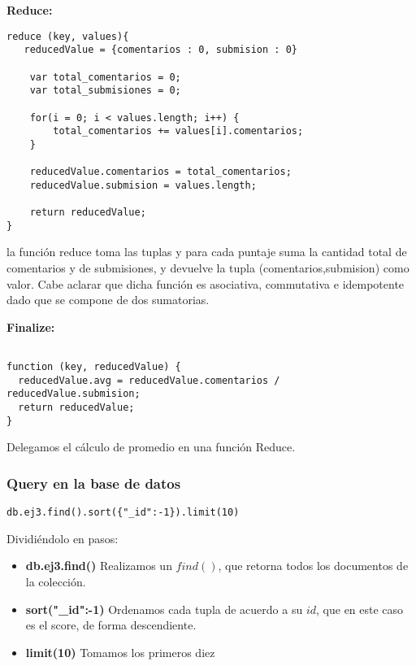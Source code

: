 \textbf{Reduce:}

\begin{lstlisting}
reduce (key, values){
   reducedValue = {comentarios : 0, submision : 0}
	
	var total_comentarios = 0;
	var total_submisiones = 0;

	for(i = 0; i < values.length; i++) {
		total_comentarios += values[i].comentarios;
	}

	reducedValue.comentarios = total_comentarios;
	reducedValue.submision = values.length;

    return reducedValue;
}

\end{lstlisting}

la funci\'on reduce toma las tuplas y para cada puntaje suma la cantidad total de comentarios y de submisiones, y devuelve la tupla (comentarios,submision) como valor. Cabe aclarar que dicha funci\'on es asociativa, commutativa e idempotente dado que se compone de dos sumatorias.

\textbf{Finalize:}

\begin{lstlisting}

function (key, reducedValue) {
  reducedValue.avg = reducedValue.comentarios / reducedValue.submision;
  return reducedValue;
}

\end{lstlisting}

Delegamos el c\'alculo de promedio en una funci\'on Reduce.

\vspace{2mm}

\subsubsection{Query en la base de datos}

\begin{lstlisting}
db.ej3.find().sort({"_id":-1}).limit(10)
\end{lstlisting}


Dividi\'endolo en pasos:

\begin{itemize}

\item \textbf{db.ej3.find()} Realizamos un $find()$, que retorna todos los documentos de la colecci\'on.
\item \textbf{sort({"\_id":-1})} Ordenamos cada tupla de acuerdo a su $id$, que en este caso es el score, de forma descendiente.
\item \textbf{limit(10)} Tomamos los primeros diez

\end{itemize}

